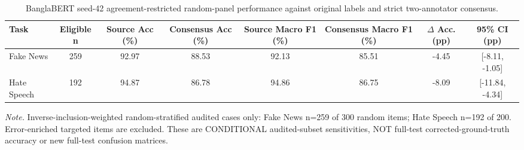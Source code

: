 \begin{table}[t]
\centering
\caption{BanglaBERT seed-42 agreement-restricted random-panel performance against original labels and strict two-annotator consensus.}
\label{tab:human_sensitivity}
\footnotesize
\begin{adjustbox}{max width=\linewidth}
\begin{tabular}{lccccccc}
\toprule
Task & Eligible n & Source Acc (\%) & Consensus Acc (\%) & Source Macro F1 (\%) & Consensus Macro F1 (\%) & $\Delta$ Acc. (pp) & 95\% CI (pp) \\
\midrule
Fake News & 259 & 92.97 & 88.53 & 92.13 & 85.51 & -4.45 & [-8.11, -1.05] \\
Hate Speech & 192 & 94.87 & 86.78 & 94.86 & 86.75 & -8.09 & [-11.84, -4.34] \\
\bottomrule
\end{tabular}
\end{adjustbox}
\par\vspace{2pt}
\begin{minipage}{\linewidth}
\scriptsize\emph{Note.} Inverse-inclusion-weighted random-stratified audited cases only: Fake News n=259 of 300 random items; Hate Speech n=192 of 200. Error-enriched targeted items are excluded. These are CONDITIONAL audited-subset sensitivities, NOT full-test corrected-ground-truth accuracy or new full-test confusion matrices.
\end{minipage}
\end{table}

